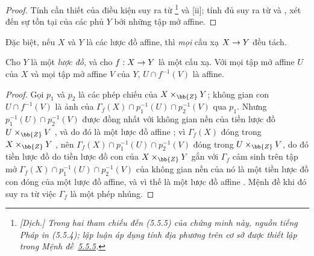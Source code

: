\documentclass[oneside]{amsart}
\makeatletter
\newcommand{\ega@arrow}[2]{\mathchoice{#1}{#2}{#2}{#2}}
\renewcommand{\to}{\ega@arrow{\longrightarrow}{\rightarrow}}
\newcommand{\oldpage}[2][]{{\marginnote{\normalfont\textbf{#1}~|~#2}}\ignorespaces}
\let\EGAOriginalLabel\label
\renewcommand{\label}[1]{\phantomsection\EGAOriginalLabel{#1}}
\makeatother
\begin{document}
\begin{proof}
Tính cần thiết của điều kiện suy ra từ \footnote{\emph{[Dịch.]
Trong hai tham chiếu đến (5.5.5) của chứng minh này, nguồn tiếng Pháp in
(5.5.4); lập luận áp dụng tính địa phương trên cơ sở được thiết lập trong
Mệnh đề~\hyperref[I.5.5.5]{5.5.5}.}} và [ii]; tính đủ suy
ra từ  và , xét đến sự tồn tại của các phủ $Y$
bởi những tập mở affine.
\end{proof}

Đặc biệt, nếu $X$ và $Y$ là các lược đồ affine, thì \emph{mọi} cấu xạ
$X\to Y$ đều tách.

\begin{proposition}[5.5.10]
\label{I.5.5.10}
Cho $Y$ là một \emph{lược đồ}, và cho $f:X\to Y$ là một cấu xạ.
Với mọi tập mở affine $U$ của $X$ và mọi tập mở affine $V$ của $Y$,
$U\cap f^{-1}(V)$ là affine.
\end{proposition}

\begin{proof}
Gọi $p_1$ và $p_2$ là các phép chiếu của $X\times_\bb{Z}Y$;
không gian con $U\cap f^{-1}(V)$ là ảnh của
$\Gamma_f(X)\cap p_1^{-1}(U)\cap p_2^{-1}(V)$ qua $p_1$.
Nhưng $p_1^{-1}(U)\cap p_2^{-1}(V)$ được đồng nhất với không gian nền của
\oldpage[I]{139}
tiền lược đồ $U\times_\bb{Z}V$ , và do đó là một lược đồ affine
; vì $\Gamma_f(X)$ đóng trong $X\times_\bb{Z}Y$
, nên $\Gamma_f(X)\cap p_1^{-1}(U)\cap p_2^{-1}(V)$ đóng trong
$U\times_\bb{Z} V$, do đó tiền lược đồ do tiền lược đồ con của
$X\times_\bb{Z}Y$ gắn với $\Gamma_f$  cảm sinh trên tập mở
$\Gamma_f(X)\cap p_1^{-1}(U)\cap p_2^{-1}(V)$ của không gian nền của nó là
một tiền lược đồ con đóng của một lược đồ affine, và vì thế là một lược đồ
affine .
Mệnh đề khi đó suy ra từ việc $\Gamma_f$ là một phép nhúng.
\end{proof}
\end{document}
